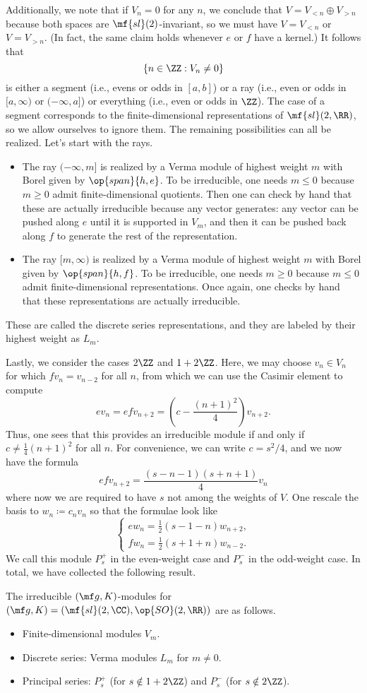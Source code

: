 \documentclass[../notes.tex]{subfiles}
\begin{document}
Additionally, we note that if $V_n=0$ for any $n$, we conclude that $V=V_{<n}\oplus V_{>n}$ because both spaces are $\mf{sl}(2)$-invariant, so we must have $V=V_{<n}$ or $V=V_{>n}$. (In fact, the same claim holds whenever $e$ or $f$ have a kernel.) It follows that
\[\{n\in\ZZ:V_n\ne0\}\]
is either a segment (i.e., evens or odds in $[a,b]$) or a ray (i.e., even or odds in $[a,\infty)$ or $(-\infty,a]$) or everything (i.e., even or odds in $\ZZ$). The case of a segment corresponds to the finite-dimensional representations of $\mf{sl}(2,\RR)$, so we allow ourselves to ignore them. The remaining possibilities can all be realized. Let's start with the rays.
\begin{itemize}
	\item The ray $(-\infty,m]$ is realized by a Verma module of highest weight $m$ with Borel given by $\op{span}\{h,e\}$. To be irreducible, one needs $m\le0$ because $m\ge0$ admit finite-dimensional quotients. Then one can check by hand that these are actually irreducible because any vector generates: any vector can be pushed along $e$ until it is supported in $V_m$, and then it can be pushed back along $f$ to generate the rest of the representation.
	\item The ray $[m,\infty)$ is realized by a Verma module of highest weight $m$ with Borel given by $\op{span}\{h,f\}$. To be irreducible, one needs $m\ge0$ because $m\le0$ admit finite-dimensional representations. Once again, one checks by hand that these representations are actually irreducible.
\end{itemize}
These are called the discrete series representations, and they are labeled by their highest weight as $L_m$.

Lastly, we consider the cases $2\ZZ$ and $1+2\ZZ$. Here, we may choose $v_n\in V_n$ for which $fv_n=v_{n-2}$ for all $n$, from which we can use the Casimir element to compute
\[ev_n=efv_{n+2}=\left(c-\frac{(n+1)^2}4\right)v_{n+2}.\]
Thus, one sees that this provides an irreducible module if and only if $c\ne\frac14(n+1)^2$ for all $n$. For convenience, we can write $c=s^2/4$, and we now have the formula
\[efv_{n+2}=\frac{(s-n-1)(s+n+1)}4v_n\]
where now we are required to have $s$ not among the weights of $V$. One rescale the basis to $w_n\coloneqq c_nv_n$ so that the formulae look like
\[\begin{cases}
	ew_n=\frac12(s-1-n)w_{n+2}, \\
	fw_n=\frac12(s+1+n)w_{n-2}.
\end{cases}\]
We call this module $P_s^+$ in the even-weight case and $P_s^-$ in the odd-weight case. In total, we have collected the following result.
\begin{theorem}
	The irreducible $(\mf g,K)$-modules for $(\mf g,K)=(\mf{sl}(2,\CC),\op{SO}(2,\RR))$ are as follows.
	\begin{itemize}
		\item Finite-dimensional modules $V_m$.
		\item Discrete series: Verma modules $L_m$ for $m\ne0$.
		\item Principal series: $P_s^+$ (for $s\notin1+2\ZZ$) and $P_s^-$ (for $s\notin2\ZZ$).
	\end{itemize}
\end{theorem}
\end{document}
